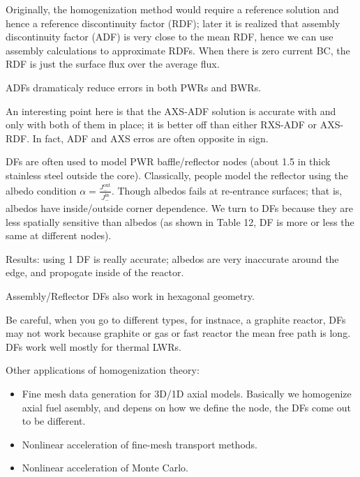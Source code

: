 \documentclass{school-22.211-notes}
\begin{document}
Originally, the homogenization method would require a reference solution and hence a reference discontinuity factor (RDF); later it is realized that assembly discontinuity factor (ADF) is very close to the mean RDF, hence we can use assembly calculations to approximate RDFs. When there is zero current BC, the RDF is just the surface flux over the average flux. 

ADFs dramaticaly reduce errors in both PWRs and BWRs. 

An interesting point here is that the AXS-ADF solution is accurate with and only with both of them in place; it is better off than either RXS-ADF or AXS-RDF. In fact, ADF and AXS erros are often opposite in sign. 

\clearpage
{}
DFs are often used to model PWR baffle/reflector nodes (about 1.5 in thick stainless steel outside the core). Classically, people model the reflector using the albedo condition $\alpha = \frac{J_-^{\mathrm{out}}}{J_-^{\mathrm{in}}}$. Though albedos fails at re-entrance surfaces; that is, albedos have inside/outside corner dependence. We turn to DFs because they are less spatially sensitive than albedos (as shown in Table 12, DF is more or less the same at different nodes). 

Results: using 1 DF is really accurate; albedos are very inaccurate around the edge, and propogate inside of the reactor. 

Assembly/Reflector DFs also work in hexagonal geometry. 

Be careful, when you go to different types, for instnace, a graphite reactor, DFs may not work because graphite or gas or fast reactor the mean free path is long. DFs work well mostly for thermal LWRs. 

Other applications of homogenization theory: 
\begin{itemize}
\item Fine mesh data generation for 3D/1D axial models. Basically we homogenize axial fuel asembly, and depens on how we define the node, the DFs come out to be different. 
\item Nonlinear acceleration of fine-mesh transport methods. 
\item Nonlinear acceleration of Monte Carlo. 
\end{itemize}


\clearpage
{}
\end{document}
